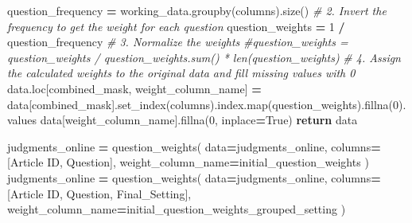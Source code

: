 \documentclass[
]{article}
\newenvironment{Shaded}{\begin{snugshade}}{\end{snugshade}}
\newcommand{\BuiltInTok}[1]{#1}
\newcommand{\CommentTok}[1]{\textcolor[rgb]{0.56,0.35,0.01}{\textit{#1}}}
\newcommand{\ControlFlowTok}[1]{\textcolor[rgb]{0.13,0.29,0.53}{\textbf{#1}}}
\newcommand{\DecValTok}[1]{\textcolor[rgb]{0.00,0.00,0.81}{#1}}
\newcommand{\NormalTok}[1]{#1}
\newcommand{\OperatorTok}[1]{\textcolor[rgb]{0.81,0.36,0.00}{\textbf{#1}}}
\newcommand{\StringTok}[1]{\textcolor[rgb]{0.31,0.60,0.02}{#1}}
\newcommand{\VariableTok}[1]{\textcolor[rgb]{0.00,0.00,0.00}{#1}}
\begin{document}
\begin{Shaded}
\begin{Highlighting}[]
\NormalTok{    question\_frequency }\OperatorTok{=}\NormalTok{ working\_data.groupby(columns).size()}
    \CommentTok{\# 2. Invert the frequency to get the weight for each question}
\NormalTok{    question\_weights }\OperatorTok{=} \DecValTok{1} \OperatorTok{/}\NormalTok{ question\_frequency}
    \CommentTok{\# 3. Normalize the weights}
    \CommentTok{\#question\_weights = question\_weights / question\_weights.sum() * len(question\_weights)}
    \CommentTok{\# 4. Assign the calculated weights to the original data and fill missing values with 0}
\NormalTok{    data.loc[combined\_mask, weight\_column\_name] }\OperatorTok{=}\NormalTok{ data[combined\_mask].set\_index(columns).index.}\BuiltInTok{map}\NormalTok{(question\_weights).fillna(}\DecValTok{0}\NormalTok{).values}
\NormalTok{    data[weight\_column\_name].fillna(}\DecValTok{0}\NormalTok{, inplace}\OperatorTok{=}\VariableTok{True}\NormalTok{)}
    \ControlFlowTok{return}\NormalTok{ data}

\NormalTok{judgments\_online }\OperatorTok{=}\NormalTok{ question\_weights(}
\NormalTok{    data}\OperatorTok{=}\NormalTok{judgments\_online, }
\NormalTok{    columns}\OperatorTok{=}\NormalTok{[}\StringTok{\textquotesingle{}Article ID\textquotesingle{}}\NormalTok{, }\StringTok{\textquotesingle{}Question\textquotesingle{}}\NormalTok{], }
\NormalTok{    weight\_column\_name}\OperatorTok{=}\StringTok{\textquotesingle{}initial\_question\_weights\textquotesingle{}}
\NormalTok{)}
\NormalTok{judgments\_online }\OperatorTok{=}\NormalTok{ question\_weights(}
\NormalTok{    data}\OperatorTok{=}\NormalTok{judgments\_online, }
\NormalTok{    columns}\OperatorTok{=}\NormalTok{[}\StringTok{\textquotesingle{}Article ID\textquotesingle{}}\NormalTok{, }\StringTok{\textquotesingle{}Question\textquotesingle{}}\NormalTok{, }\StringTok{\textquotesingle{}Final\_Setting\textquotesingle{}}\NormalTok{], }
\NormalTok{    weight\_column\_name}\OperatorTok{=}\StringTok{\textquotesingle{}initial\_question\_weights\_grouped\_setting\textquotesingle{}}
\NormalTok{)}
\end{Highlighting}
\end{Shaded}
\end{document}
